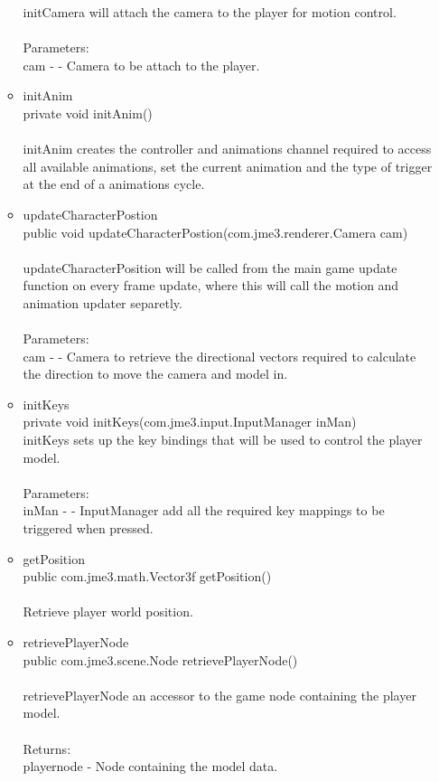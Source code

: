 \documentclass[letterpaper]{article}
\begin{document}
\begin{itemize}
\begin{itemize}
											initCamera will attach the camera to the player for motion control. \\ \\
											Parameters: \\
											cam - - Camera to be attach to the player.
									\item	initAnim \\
											private void initAnim() \\ \\
											initAnim creates the controller and animations channel required to access all available animations, set the current animation and the type of trigger at the end of a animations cycle.
									\item	updateCharacterPostion \\
											public void updateCharacterPostion(com.jme3.renderer.Camera cam) \\ \\
											updateCharacterPosition will be called from the main game update function on every frame update, where this will call the motion and animation updater separetly. \\ \\
											Parameters: \\
											cam - - Camera to retrieve the directional vectors required to calculate the direction to move the camera and model in.
									\item	initKeys \\
											private void initKeys(com.jme3.input.InputManager inMan) \\
											initKeys sets up the key bindings that will be used to control the player model. \\ \\
											Parameters: \\
											inMan - - InputManager add all the required key mappings to be triggered when pressed.
									\item	getPosition \\
											public com.jme3.math.Vector3f getPosition() \\ \\
											Retrieve player world position.
									\item	retrievePlayerNode \\
											public com.jme3.scene.Node retrievePlayerNode() \\ \\
											retrievePlayerNode an accessor to the game node containing the player model. \\ \\
											Returns: \\
											playernode - Node containing the model data.
								\end{itemize}
					\end{itemize}
				
\end{document}

